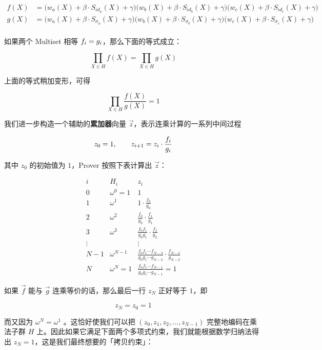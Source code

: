 \[
\begin{split}
f(X)&=\Big(w_a(X)+\beta\cdot S_{id_a}(X)+\gamma\Big)\Big(w_b(X)+\beta\cdot S_{id_b}(X)+\gamma\Big)\Big(w_c(X)+\beta\cdot S_{id_c}(X)+\gamma\Big)\\
g(X)&=\Big(w_a(X)+\beta\cdot S_{\sigma_a}(X)+\gamma\Big)\Big(w_b(X)+\beta\cdot S_{\sigma_b}(X)+\gamma\Big)\Big(w_c(X)+\beta\cdot S_{\sigma_c}(X)+\gamma\Big)\\
\end{split}
\]

如果两个 Multiset 相等 \(\\{f_i\\}=\\{g_i\\}\)，那么下面的等式成立：

\[
\prod_{X\in H}f(X) = \prod_{X\in H}g(X)
\]

上面的等式稍加变形，可得

\[
\prod_{X\in H}\frac{f(X)}{g(X)} = 1
\]

我们进一步构造一个辅助的\textbf{累加器}向量
\(\vec{z}\)，表示连乘计算的一系列中间过程

\[
z_0 = 1, \qquad z_{i+1}=z_i\cdot \frac{f_i}{g_i}\\
\]

其中 \(z_0\) 的初始值为 \(1\)，Prover 按照下表计算出 \(\vec{z}\)：

\[
\begin{array}{|c|c|c|}
i & H_i & z_i\\
\hline
0 & \omega^0=1 & 1\\
1 & \omega^1 & 1\cdot \frac{f_0}{g_0}\\
2 & \omega^2 & \frac{f_0}{g_0}\cdot \frac{f_1}{g_1}\\
3 & \omega^3 & \frac{f_0f_1}{g_0g_1}\cdot \frac{f_2}{g_2}\\
\vdots & & \vdots\\
N-1 & \omega^{N-1} & \frac{f_0f_1\cdots f_{N-3}}{g_0g_1\cdots g_{N-3}}\cdot \frac{f_{N-2}}{g_{N-2}} \\
N & \omega^{N}=1 & \frac{f_0f_1\cdots f_{N-1}}{g_0g_1\cdots g_{N-1}}  = 1 
\end{array}
\]

如果 \(\vec{f}\) 能与 \(\vec{g}\) 连乘等价的话，那么最后一行 \(z_{N}\)
正好等于 \(1\)，即

\[
z_{N} = z_0 = 1
\]

而又因为 \(\omega^{N} = \omega^1\) 。这恰好使我们可以把
\((z_0, z_1, z_2, \ldots, z_{N-1})\) 完整地编码在乘法子群 \(H\)
上。因此如果它满足下面两个多项式约束，我们就能根据数学归纳法得出
\(z_{N} = 1\)，这是我们最终想要的「拷贝约束」：

